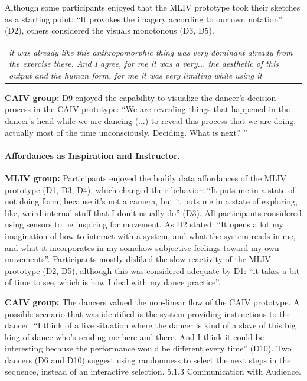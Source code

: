 Although some participants enjoyed that the MLIV prototype took their sketches as a starting point: “It provokes the imagery according to our own notation” (D2), others considered the visuals monotonous (D3, D5).

\begin{center}
\begin{tabular}{ p{13cm}}
\textit{it was already like this anthropomorphic thing was very dominant already from the exercise there. And I agree, for me it was a very... the aesthetic of this output and the human form, for me it was very limiting while using it}
\end{tabular}
\end{center}

\textbf{CAIV group:} D9 enjoyed the capability to visualize the dancer’s decision process in the CAIV prototype: “We are revealing things that happened in the dancer’s head while we are dancing (...) to reveal this process that we are doing, actually most of the time unconsciously. Deciding. What is next? ”

\paragraph{Affordances as Inspiration and Instructor.}

\textbf{MLIV group:} Participants enjoyed the bodily data affordances of the MLIV prototype (D1, D3, D4), which changed their behavior: “It puts me in a state of not doing form, because it’s not a camera, but it puts me in a state of exploring, like, weird internal stuff that I don’t usually do” (D3). All participants considered using sensors to be inspiring for movement. As D2 stated: “It opens a lot my imagination of how to interact with a system, and what the system reads in me, and what it incorporates in my somehow subjective feelings toward my own movements”. Participants mostly disliked the slow reactivity of the MLIV prototype (D2, D5), although this was considered adequate by D1: “it takes a bit of time to see, which is how I deal with my dance practice”.

\textbf{CAIV group:} The dancers valued the non-linear flow of the CAIV prototype. A possible scenario that was identified is the system providing instructions to the dancer: “I think of a live situation where the dancer is kind of a slave of this big king of dance who’s sending me here and there. And I think it could be interesting because the performance would be different every time” (D10). Two dancers (D6 and D10) suggest using randomness to select the next steps in the sequence, instead of an interactive selection.
5.1.3 Communication with Audience.

